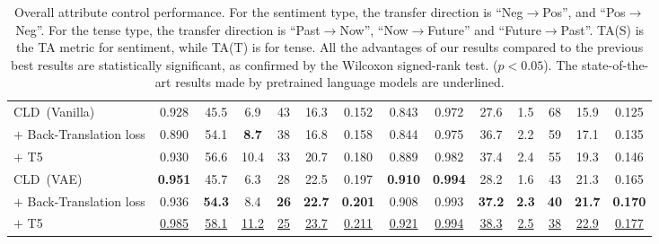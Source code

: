 \documentclass[11pt,a4paper]{article}
\newcommand{\Mname}{CLD}
\begin{document}
\begin{table*}[!ht]
{{\begin{tabular}{lcccc cc| ccccccc}
  \midrule[0.5pt]
  \Mname~(Vanilla)   & 0.928  &45.5   &6.9   &  43         &      16.3   &  0.152  & 0.843 & 0.972&  27.6 & 1.5 & 68& 15.9&0.125 \\
  $+$ Back-Translation loss    & 0.890  &54.1  &\textbf{8.7}   &  38         &    16.8    &0.158 & 0.844& 0.975 & 36.7  &2.2  & 59& 17.1 &0.135\\
 $+$ T5   & 0.930  &56.6   &10.4   &  33         &      20.7   &  0.180     & 0.889 & 0.982&  37.4 & 2.4 & 55& 19.3& 0.146 \\
 \Mname~(VAE)       &\textbf{0.951} & 45.7 & 6.3  &    28  &   22.5 &0.197 & \textbf{0.910}& \textbf{0.994 }& 28.2& 1.6&    43& 21.3 &0.165\\
 $+$ Back-Translation loss    & 0.936   & \textbf{54.3}  & 8.4  &   \textbf{26}        & \textbf{22.7}   &\textbf{0.201}    & 0.908& 0.993 & \textbf{37.2}   & \textbf{2.3}  & \textbf{40} &  \textbf{21.7}&\textbf{0.170} \\
  $+$ T5       &\underline{0.985} & \underline{58.1} & \underline{11.2}  &    \underline{25}  &   \underline{23.7} & \underline{0.211 } & \underline{0.921}& \underline{0.994 }& \underline{38.3}& \underline{2.5}&    \underline{38}& \underline{22.9} & \underline{0.177}\\
  \bottomrule[1.0pt]
\end{tabular}
}}

\smallskip 
\caption{Overall attribute control performance.  For the sentiment type, the transfer direction  is  ``Neg$\rightarrow$Pos'', and ``Pos$\rightarrow$Neg''.   For the tense type, the transfer direction  is  ``Past$\rightarrow$Now'', ``Now$\rightarrow$Future'' and ``Future$\rightarrow$Past''. TA(S) is the TA metric for sentiment, while TA(T) is for tense. All the advantages of our results compared to the previous best results are statistically significant, as confirmed by the Wilcoxon signed-rank test. ($p<0.05$). The state-of-the-art results made by pretrained language models are underlined.}
\label{tab:overall}
\end{table*}%
\end{document}
